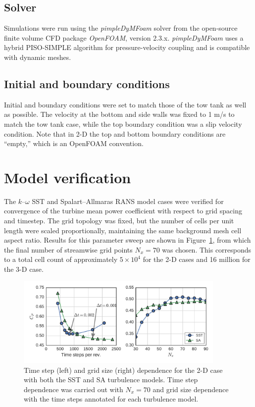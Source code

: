 \documentclass[aip,graphicx]{revtex4-1}
\begin{document}
\subsection{Solver}

Simulations were run using the \textit{pimpleDyMFoam} solver from the
open-source finite volume CFD package \textit{OpenFOAM}, version 2.3.x.
\textit{pimpleDyMFoam} uses a hybrid PISO-SIMPLE algorithm for pressure-velocity
coupling and is compatible with dynamic meshes.

\subsection{Initial and boundary conditions}

Initial and boundary conditions were set to match those of the tow tank as well
as possible. The velocity at the bottom and side walls was fixed to 1 m/s to
match the tow tank case, while the top boundary condition was a slip velocity
condition. Note that in 2-D the top and bottom boundary conditions are
``empty,'' which is an OpenFOAM convention.

\section{Model verification}

The $k$--$\omega$ SST and Spalart--Allmaras RANS model cases were verified for
convergence of the turbine mean power coefficient with respect to grid spacing
and timestep. The grid topology was fixed, but the number of cells per unit
length were scaled proportionally, maintaining the same background mesh cell
aspect ratio. Results for this parameter sweep are shown in
Figure~\ref{fig:verification}, from which the final number of streamwise
grid points $N_x = 70$ was chosen. This corresponds to a total cell count of
approximately $5 \times 10^4$ for the 2-D cases and 16 million for the 3-D case.

\begin{figure}[ht]
    \centering

    \includegraphics[width=0.9\textwidth]{figures/verification}

    \caption{Time step (left) and grid size (right) dependence for the 2-D case
        with both the SST and SA turbulence models. Time step dependence was carried
        out with $N_x=70$ and grid size dependence with the time steps annotated for
        each turbulence model.}

    \label{fig:verification}
\end{figure}
\end{document}
